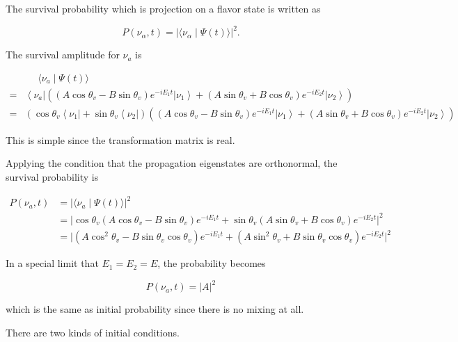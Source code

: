 \documentclass{tufte-handout}
\newcommand{\bra}[1]{\left\langle #1\right|}
\newcommand{\ket}[1]{\left| #1\right\rangle}
\newcommand{\braket}[2]{\langle #1 \mid #2 \rangle}
\begin{document}
The survival probability which is projection on a flavor state is written as

\begin{equation}
    P(\nu_\alpha,t) = \lvert \braket{\nu_\alpha}{\Psi(t)} \rvert^2.
\end{equation}

The survival amplitude for $\nu_a$ is

\begin{align*}
    &\phantom{=}\braket{\nu_a}{\Psi(t)} \\
     =& \bra{\nu_a}\left(  ( A \cos\theta_v - B \sin\theta_v) e^{-iE_1 t} \ket{\nu_1} +  (A\sin\theta_v + B \cos\theta_v
    ) e^{-i E_2t} \ket{\nu_2} \right) \\
     =& \left ( \cos\theta_v \bra{\nu_1} + \sin\theta_v \bra{\nu_2} \right)  \left(   ( A \cos\theta_v - B \sin\theta_v) e^{-iE_1 t} \ket{\nu_1} +  (A\sin\theta_v + B \cos\theta_v
    ) e^{-i E_2 t} \ket{\nu_2}  \right )
\end{align*}

This is simple since the transformation matrix is real.

Applying the condition that the propagation eigenstates are orthonormal, the survival probability is

\begin{align*}
    P(\nu_a,t) & = \lvert \braket{\nu_a}{\Psi(t)}\rvert^2 \\
    & = \lvert \cos\theta_v (A\cos\theta_v -B\sin\theta_v) e^{-iE_1t} + \sin\theta_v(A\sin\theta_v + B \cos\theta_v) e^{-iE_2t} \rvert^2\\
    & =\lvert ( A \cos^2\theta_v - B \sin\theta_v \cos\theta_v ) e^{-iE_1t} + ( A \sin^2\theta_v + B \sin\theta_v \cos\theta_v )e^{-iE_2t} \rvert^2
\end{align*}

In a special limit that $E_1=E_2=E$, the probability becomes

\begin{equation}
    P(\nu_a,t) = \lvert A\rvert^2 
\end{equation}

which is the same as initial probability since there is no mixing at all.

There are two kinds of initial conditions.
\end{document}
